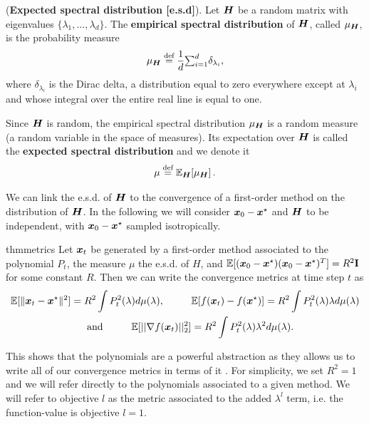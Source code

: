 \documentclass{article}
\begin{document}
\begin{definition}
(\textbf{Expected spectral distribution [e.s.d]}). 
Let ${\boldsymbol H}$ be a random matrix with eigenvalues $\{\lambda_1, \ldots, \lambda_d\}$. The \textbf{empirical spectral distribution} of ${\boldsymbol H}$, called ${\mu}_{{\boldsymbol H}}$, is the probability measure
\begin{equation}\label{eq:wighted_spectral_density}
    \mu_{{\boldsymbol H}} \stackrel{\text{def}}{=} \frac{1}{d}{\textstyle{\sum_{i=1}^d}} \delta_{\lambda_i},
\end{equation}
where $\delta_{\lambda_i}$ is the Dirac delta, a distribution equal to zero everywhere except at $\lambda_i$ and whose integral over the entire real line is equal to one.

Since ${\boldsymbol H}$ is random, the empirical spectral distribution $\mu_{\boldsymbol H}$ is a random measure (a random variable in the space of measures). Its expectation over ${\boldsymbol H}$ is called the \textbf{expected spectral distribution} and we denote it
\begin{equation}
\mu \stackrel{\text{def}}{=} {\mathbb{E}}_{{\boldsymbol H}}[\mu_{{\boldsymbol H}}]\,.
\end{equation}
\end{definition}

We can link the e.s.d. of ${\boldsymbol H}$ to the convergence of a first-order method on the distribution of ${\boldsymbol H}$. In the following we will consider ${\boldsymbol x}_0-{\boldsymbol x}^\star$ and ${\boldsymbol H}$ to be independent, with ${\boldsymbol x}_0-{\boldsymbol x}^\star$ sampled isotropically. %

\begin{restatable}{thm}{metrics} \label{thm: metrics}
Let ${\boldsymbol x}_t$ be generated by a first-order method associated to the polynomial $P_t$, the measure $\mu$ the  e.s.d. of $H$, and $\mathbb{E}[({\boldsymbol x}_0-{\boldsymbol x}^\star)({\boldsymbol x}_0-{\boldsymbol x}^\star)^T]=R^2\textbf{I}$ for some constant $R$. Then we can write the convergence metrics at time step  $t$ as
\begin{equation}
\begin{split}
\label{eq:error_norm_x}
  \mathbb{E}[\|{\boldsymbol x}_t-{\boldsymbol x}^\star\|^2] = { R^2} \int {P_t^2(\lambda) d\mu(\lambda)}, \hspace{1 cm}
    &\mathbb{E}[f({\boldsymbol x}_t)-f({\boldsymbol x}^\star)]=R^2\int P_t^2(\lambda)\lambda d\mu(\lambda)\\
    \text{and} \hspace{1 cm} \mathbb{E}[||\nabla f({\boldsymbol x}_t)||^2_2]&=R^2\int P_t^2(\lambda)\lambda^2d\mu(\lambda) .
\end{split}
\end{equation}
\end{restatable}
This shows that the polynomials are a powerful abstraction as they allows us to write all of our convergence metrics in terms of it . For simplicity, we set $R^2 = 1$ and we will refer directly to the polynomials associated to a given method. We will refer to objective $l$ as the metric associated to the added $\lambda^l$ term, i.e. the function-value is objective $l=1$.
\end{document}
